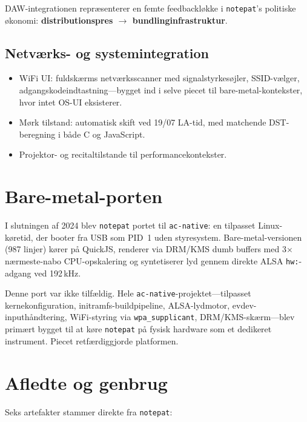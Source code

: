 \documentclass[10pt,letterpaper,twocolumn]{article}
\begin{document}
DAW-integrationen repræsenterer en femte feedbackløkke i \texttt{notepat}'s politiske økonomi: \textbf{distributionspres $\rightarrow$ bundlinginfrastruktur}.

\subsection{Netværks- og systemintegration}

\begin{itemize}
  \item WiFi UI: fuldskærms netværksscanner med signalstyrkesøjler, SSID-vælger, adgangskodeindtastning---bygget ind i selve piecet til bare-metal-kontekster, hvor intet OS-UI eksisterer.
  \item Mørk tilstand: automatisk skift ved 19/07 LA-tid, med matchende DST-beregning i både C og JavaScript.
  \item Projektor- og recitaltilstande til performancekontekster.
\end{itemize}

\section{Bare-metal-porten}

I slutningen af 2024 blev \texttt{notepat} portet til \texttt{ac-native}: en tilpasset Linux-køretid, der booter fra USB som PID~1 uden styresystem. Bare-metal-versionen (987 linjer) kører på QuickJS, renderer via DRM/KMS dumb buffers med 3$\times$ nærmeste-nabo CPU-opskalering og syntetiserer lyd gennem direkte ALSA \texttt{hw:}-adgang ved 192\,kHz.

Denne port var ikke tilfældig. Hele \texttt{ac-native}-projektet---tilpasset kernekonfiguration, initramfs-buildpipeline, ALSA-lydmotor, evdev-inputhåndtering, WiFi-styring via \texttt{wpa\_supplicant}, DRM/KMS-skærm---blev primært bygget til at køre \texttt{notepat} på fysisk hardware som et dedikeret instrument. Piecet retfærdiggjorde platformen.

\section{Afledte og genbrug}

Seks artefakter stammer direkte fra \texttt{notepat}:
\end{document}

